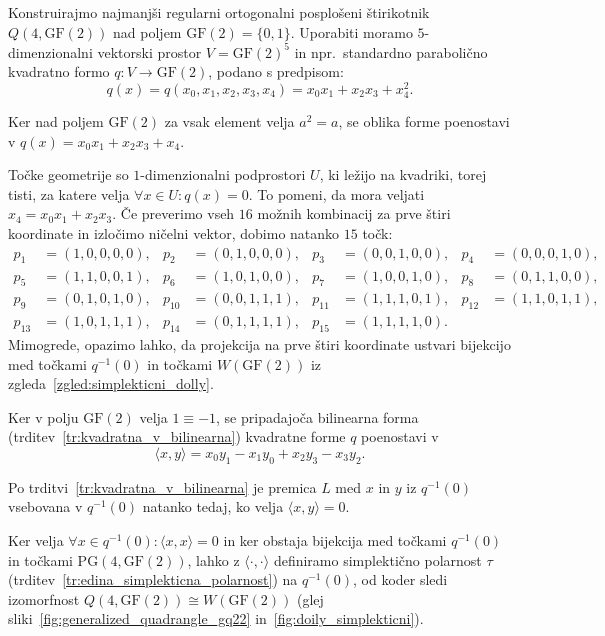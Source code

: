 \documentclass[fin1, tisk]{fmfdelo}
\newcommand{\PG}{\mathrm{PG}}
\newcommand{\GF}{\mathrm{GF}}
\begin{document}
\begin{zgled}\label{zgled:ortogonalni_dolly}
    Konstruirajmo najmanjši regularni ortogonalni posplošeni štirikotnik $Q(4, \GF(2))$ nad poljem $\GF(2) = \{0, 1\}$. 
    Uporabiti moramo $5$-dimenzionalni vektorski prostor $V = \GF(2)^5$ in npr.~standardno parabolično 
    kvadratno formo $q: V \to \GF(2)$, podano s predpisom:
    $$q(x) = q(x_0, x_1, x_2, x_3, x_4) = x_0 x_1 + x_2 x_3 + x_4^2.$$
    
    Ker nad poljem $\GF(2)$ za vsak element velja $a^2 = a$, se oblika forme poenostavi v 
    $q(x) = x_0 x_1 + x_2 x_3 + x_4$.
    
    Točke geometrije so $1$-dimenzionalni podprostori $U$, ki ležijo na kvadriki, torej tisti,
    za katere velja $\forall x \in U: q(x) = 0$. To pomeni, da mora veljati $x_4 = x_0 x_1 + x_2 x_3$. 
    Če preverimo vseh $16$ možnih kombinacij za prve štiri koordinate in izločimo ničelni vektor, 
    dobimo natanko $15$ točk:
    \begin{align*}
        p_1 &= (1,0,0,0,0), & p_2 &= (0,1,0,0,0), & p_3 &= (0,0,1,0,0), & p_4 &= (0,0,0,1,0), \\
        p_5 &= (1,1,0,0,1), & p_6 &= (1,0,1,0,0), & p_7 &= (1,0,0,1,0), & p_8 &= (0,1,1,0,0), \\
        p_9 &= (0,1,0,1,0), & p_{10} &= (0,0,1,1,1), & p_{11} &= (1,1,1,0,1), & p_{12} &= (1,1,0,1,1), \\
        p_{13} &= (1,0,1,1,1), & p_{14} &= (0,1,1,1,1), & p_{15} &= (1,1,1,1,0).
    \end{align*}
    Mimogrede, opazimo lahko, da projekcija na prve štiri koordinate ustvari bijekcijo med točkami $q^{-1}(0)$ in točkami 
    $W(\GF(2))$ iz zgleda~\ref{zgled:simplekticni_dolly}.

    Ker v polju $\GF(2)$ velja $1\equiv -1$, se pripadajoča bilinearna forma (trditev~\ref{tr:kvadratna_v_bilinearna}) kvadratne forme $q$ poenostavi v
    $$\langle x, y \rangle = x_0 y_1 - x_1 y_0 + x_2 y_3 - x_3 y_2.$$
    
    Po trditvi~\ref{tr:kvadratna_v_bilinearna} je premica $L$ med $x$ in $y$ iz $q^{-1}(0)$
    vsebovana v $q^{-1}(0)$ natanko tedaj, ko velja $\langle x, y \rangle = 0$.

    Ker velja $\forall x\in q^{-1}(0): \langle x, x \rangle = 0$ in ker obstaja bijekcija med točkami $q^{-1}(0)$ in točkami $\PG(4, \GF(2))$,
    lahko z $\langle \cdot, \cdot\rangle$ definiramo simplektično polarnost $\tau$ (trditev~\ref{tr:edina_simplekticna_polarnost}) na $q^{-1}(0)$, od koder sledi
    izomorfnost $Q(4, \GF(2)) \cong W(\GF(2))$ (glej sliki~\ref{fig:generalized_quadrangle_gq22} in~\ref{fig:doily_simplekticni}).
\end{zgled}
\end{document}
